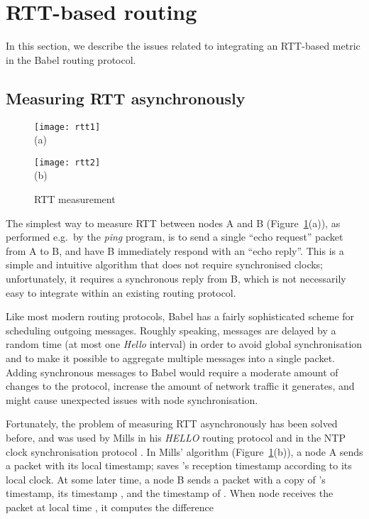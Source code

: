 \documentclass[conference,letterpaper]{IEEEtran}
\begin{document}
\section{RTT-based routing}

In this section, we describe the issues related to integrating an
RTT-based metric in the Babel routing protocol.

\subsection{Measuring RTT asynchronously} \label{sec:async-rtt}

\begin{figure}[htb]
\begin{minipage}[b]{0.2\textwidth}
\centering
\texttt{[image: rtt1]}\\
(a)
\end{minipage}
\hfill
\begin{minipage}[b]{0.2\textwidth}
\centering
\texttt{[image: rtt2]}\\
(b)
\end{minipage}
\caption{RTT measurement}\label{fig:rtt}
\end{figure}

The simplest way to measure RTT between nodes A and
B (Figure~\ref{fig:rtt}(a)), as performed e.g.\ by the \emph{ping}
program, is to send a single ``echo request'' packet from A to B, and
have B immediately respond with an ``echo reply''.  This is a simple
and intuitive algorithm that does not require synchronised clocks;
unfortunately, it requires a synchronous reply from B, which is not
necessarily easy to integrate within an existing routing protocol.

Like most modern routing protocols, Babel has a fairly sophisticated
scheme for scheduling outgoing messages.  Roughly speaking, messages
are delayed by a random time (at most one \emph{Hello} interval) in
order to avoid global synchronisation \cite{jitter} and to make it
possible to aggregate multiple messages into a single packet.  Adding
synchronous messages to Babel would require a moderate amount of
changes to the protocol, increase the amount of network traffic it
generates, and might cause unexpected issues with node
synchronisation.

Fortunately, the problem of measuring RTT asynchronously has been
solved before, and was used by Mills in his \emph{HELLO} routing
protocol \cite{mills83} and in the NTP clock synchronisation protocol
\cite{NTPv4}.  In Mills' algorithm (Figure~\ref{fig:rtt}(b)), a node
A sends a packet  with its local timestamp;  saves 's
reception timestamp  according to its local clock.  At some later
time, a node B sends a packet  with a copy  of 's
timestamp, its timestamp , and the timestamp  of .
When node  receives the packet  at local time , it
computes the difference
\end{document}
